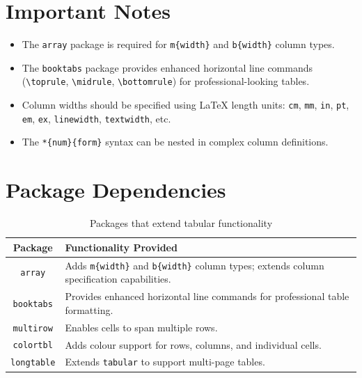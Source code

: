 \documentclass[12pt]{article}
\begin{document}
	\section*{Important Notes}
	\begin{itemize}
		\item The \texttt{array} package is required for \texttt{m\{width\}} and \texttt{b\{width\}} column types.
		\item The \texttt{booktabs} package provides enhanced horizontal line commands (\texttt{\textbackslash toprule}, \texttt{\textbackslash midrule}, \texttt{\textbackslash bottomrule}) for professional-looking tables.
		\item Column widths should be specified using LaTeX length units: \texttt{cm}, \texttt{mm}, \texttt{in}, \texttt{pt}, \texttt{em}, \texttt{ex}, \texttt{linewidth}, \texttt{textwidth}, etc.
		\item The \texttt{*\{num\}\{form\}} syntax can be nested in complex column definitions.
	\end{itemize}
	
	\section*{Package Dependencies}
	\begin{table}[h]
		\centering
		\begin{tabular}{|c|p{10cm}|}
			\hline
			\textbf{Package} & \textbf{Functionality Provided} \\
			\hline
			\texttt{array} & Adds \texttt{m\{width\}} and \texttt{b\{width\}} column types; extends column specification capabilities. \\
			\hline
			\texttt{booktabs} & Provides enhanced horizontal line commands for professional table formatting. \\
			\hline
			\texttt{multirow} & Enables cells to span multiple rows. \\
			\hline
			\texttt{colortbl} & Adds colour support for rows, columns, and individual cells. \\
			\hline
			\texttt{longtable} & Extends \texttt{tabular} to support multi-page tables. \\
			\hline
		\end{tabular}
		\caption{Packages that extend tabular functionality}
		\label{tab:packages}
	\end{table}
	
\end{document}
